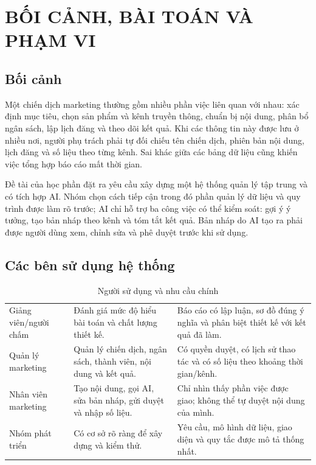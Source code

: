 \chapter{BỐI CẢNH, BÀI TOÁN VÀ PHẠM VI}

\section{Bối cảnh}

Một chiến dịch marketing thường gồm nhiều phần việc liên quan với nhau: xác định mục tiêu, chọn sản phẩm và kênh truyền thông, chuẩn bị nội dung, phân bổ ngân sách, lập lịch đăng và theo dõi kết quả. Khi các thông tin này được lưu ở nhiều nơi, người phụ trách phải tự đối chiếu tên chiến dịch, phiên bản nội dung, lịch đăng và số liệu theo từng kênh. Sai khác giữa các bảng dữ liệu cũng khiến việc tổng hợp báo cáo mất thời gian.

Đề tài của học phần đặt ra yêu cầu xây dựng một hệ thống quản lý tập trung và có tích hợp AI. Nhóm chọn cách tiếp cận trong đó phần quản lý dữ liệu và quy trình được làm rõ trước; AI chỉ hỗ trợ ba công việc có thể kiểm soát: gợi ý ý tưởng, tạo bản nháp theo kênh và tóm tắt kết quả. Bản nháp do AI tạo ra phải được người dùng xem, chỉnh sửa và phê duyệt trước khi sử dụng.

\section{Các bên sử dụng hệ thống}

\begin{table}[h!]
\centering
\small
\caption{Người sử dụng và nhu cầu chính}
\label{tab:v8-stakeholders}
\begin{tabularx}{\textwidth}{|L{3.2cm}|Y|Y|}
\hline
{} &  & \\
\hline
Giảng viên/người chấm & Đánh giá mức độ hiểu bài toán và chất lượng thiết kế. & Báo cáo có lập luận, sơ đồ đúng ý nghĩa và phân biệt thiết kế với kết quả đã làm.\\
\hline
Quản lý marketing & Quản lý chiến dịch, ngân sách, thành viên, nội dung và kết quả. & Có quyền duyệt, có lịch sử thao tác và có số liệu theo khoảng thời gian/kênh.\\
\hline
Nhân viên marketing & Tạo nội dung, gọi AI, sửa bản nháp, gửi duyệt và nhập số liệu. & Chỉ nhìn thấy phần việc được giao; không thể tự duyệt nội dung của mình.\\
\hline
Nhóm phát triển & Có cơ sở rõ ràng để xây dựng và kiểm thử. & Yêu cầu, mô hình dữ liệu, giao diện và quy tắc được mô tả thống nhất.\\
\hline
\end{tabularx}
\end{table}

